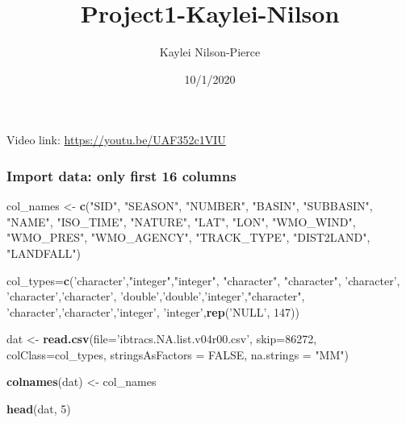 \documentclass[
]{article}
\title{Project1-Kaylei-Nilson}
\author{Kaylei Nilson-Pierce}
\date{10/1/2020}
\newenvironment{Shaded}{\begin{snugshade}}{\end{snugshade}}
\newcommand{\DataTypeTok}[1]{\textcolor[rgb]{0.13,0.29,0.53}{#1}}
\newcommand{\DecValTok}[1]{\textcolor[rgb]{0.00,0.00,0.81}{#1}}
\newcommand{\KeywordTok}[1]{\textcolor[rgb]{0.13,0.29,0.53}{\textbf{#1}}}
\newcommand{\NormalTok}[1]{#1}
\newcommand{\OtherTok}[1]{\textcolor[rgb]{0.56,0.35,0.01}{#1}}
\newcommand{\StringTok}[1]{\textcolor[rgb]{0.31,0.60,0.02}{#1}}
\begin{document}
\maketitle

Video link: \url{https://youtu.be/UAF352c1VIU}

\hypertarget{import-data-only-first-16-columns}{%
\subsubsection{Import data: only first 16
columns}\label{import-data-only-first-16-columns}}

\begin{Shaded}
\begin{Highlighting}[]
\NormalTok{col_names <-}\StringTok{ }\KeywordTok{c}\NormalTok{(}\StringTok{"SID"}\NormalTok{, }\StringTok{"SEASON"}\NormalTok{, }\StringTok{"NUMBER"}\NormalTok{, }\StringTok{"BASIN"}\NormalTok{, }\StringTok{"SUBBASIN"}\NormalTok{, }\StringTok{"NAME"}\NormalTok{, }\StringTok{"ISO_TIME"}\NormalTok{, }\StringTok{"NATURE"}\NormalTok{, }\StringTok{"LAT"}\NormalTok{, }\StringTok{"LON"}\NormalTok{, }\StringTok{"WMO_WIND"}\NormalTok{, }\StringTok{"WMO_PRES"}\NormalTok{, }\StringTok{"WMO_AGENCY"}\NormalTok{, }\StringTok{"TRACK_TYPE"}\NormalTok{, }\StringTok{"DIST2LAND"}\NormalTok{, }\StringTok{"LANDFALL"}\NormalTok{)}

\NormalTok{col_types=}\KeywordTok{c}\NormalTok{(}\StringTok{'character'}\NormalTok{,}\StringTok{"integer"}\NormalTok{,}\StringTok{"integer"}\NormalTok{, }\StringTok{"character"}\NormalTok{, }\StringTok{"character"}\NormalTok{, }\StringTok{'character'}\NormalTok{, }\StringTok{'character'}\NormalTok{,}\StringTok{'character'}\NormalTok{, }\StringTok{'double'}\NormalTok{,}\StringTok{'double'}\NormalTok{,}\StringTok{'integer'}\NormalTok{,}\StringTok{"character"}\NormalTok{, }\StringTok{'character'}\NormalTok{,}\StringTok{'character'}\NormalTok{,}\StringTok{'integer'}\NormalTok{, }\StringTok{'integer'}\NormalTok{,}\KeywordTok{rep}\NormalTok{(}\StringTok{'NULL'}\NormalTok{, }\DecValTok{147}\NormalTok{))}

\NormalTok{dat <-}\StringTok{ }\KeywordTok{read.csv}\NormalTok{(}\DataTypeTok{file=}\StringTok{'ibtracs.NA.list.v04r00.csv'}\NormalTok{, }\DataTypeTok{skip=}\DecValTok{86272}\NormalTok{,}
         \DataTypeTok{colClass=}\NormalTok{col_types, }\DataTypeTok{stringsAsFactors =} \OtherTok{FALSE}\NormalTok{, }\DataTypeTok{na.strings =} \StringTok{"MM"}\NormalTok{)}

\KeywordTok{colnames}\NormalTok{(dat) <-}\StringTok{ }\NormalTok{col_names}

\KeywordTok{head}\NormalTok{(dat, }\DecValTok{5}\NormalTok{)}
\end{Highlighting}
\end{Shaded}
\end{document}
